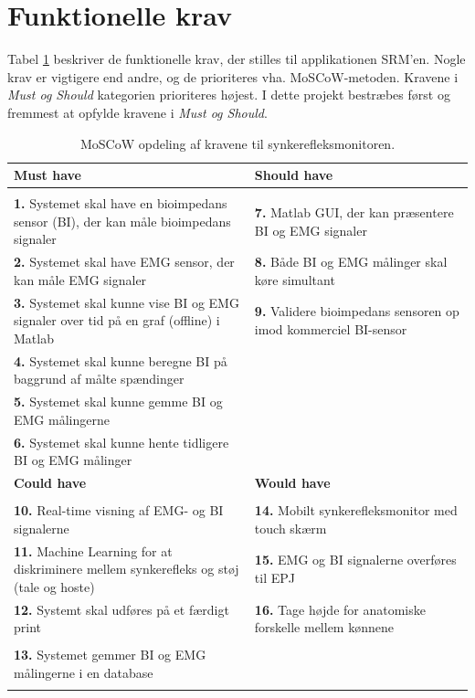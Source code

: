 \pagebreak
\section{Funktionelle krav}

Tabel \ref{tab:moscow} beskriver de funktionelle krav, der stilles til applikationen SRM'en. Nogle krav er vigtigere end andre, og de prioriteres vha. MoSCoW-metoden. Kravene i \textit{Must og Should} kategorien prioriteres højest.  I dette projekt bestræbes først og fremmest at opfylde kravene i \textit{Must og Should}. 

\begin{table}[H]

\begin{tabularx}{\textwidth}{X|X}
\rowcolor{Gray}
\toprule
\textbf{Must have} & \textbf{Should have} \\
\hline \\
\textbf{1. }Systemet skal have en bioimpedans sensor (BI), der kan måle bioimpedans signaler & \textbf{7. }Matlab GUI, der kan præsentere BI og EMG signaler \\[4ex]
\textbf{2. }Systemet skal have EMG sensor, der kan måle EMG signaler & \textbf{8. }Både BI og EMG målinger skal køre simultant\\[4ex]
\textbf{3. }Systemet skal kunne vise BI og EMG signaler over tid på en graf (offline) i Matlab  & \textbf{9. }Validere bioimpedans sensoren op imod kommerciel BI-sensor \\[4ex]
\textbf{4. }Systemet skal kunne beregne BI på baggrund af målte spændinger & \\[4ex]
\textbf{5. }Systemet skal kunne gemme BI og EMG målingerne & \\[4ex]
\textbf{6. }Systemet skal kunne hente tidligere BI og EMG målinger & \\[4ex]


\midrule
    \rowcolor{Gray}
    \textbf{Could have} & \textbf{Would have}\\
    \midrule \\
    \textbf{10. }Real-time visning af EMG- og BI signalerne & \textbf{14. }Mobilt synkerefleksmonitor med touch skærm\\[4ex]
\textbf{11. }Machine Learning for at diskriminere mellem synkerefleks og støj (tale og hoste) & \textbf{15. }EMG og BI signalerne overføres til EPJ  \\[4ex]
\textbf{12. }Systemt skal udføres på et færdigt print& \textbf{16. }Tage højde for anatomiske forskelle mellem kønnene\\[4ex]
& \\
\textbf{13. }Systemet gemmer BI og EMG målingerne i en database& \\[4ex]
& \\

\end{tabularx}

\caption{MoSCoW opdeling af kravene til  synkerefleksmonitoren.}
  \label{tab:moscow}
\end{table}


